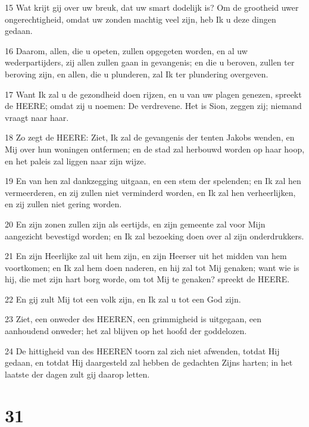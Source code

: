 \par 15 Wat krijt gij over uw breuk, dat uw smart dodelijk is? Om de grootheid uwer ongerechtigheid, omdat uw zonden machtig veel zijn, heb Ik u deze dingen gedaan.
\par 16 Daarom, allen, die u opeten, zullen opgegeten worden, en al uw wederpartijders, zij allen zullen gaan in gevangenis; en die u beroven, zullen ter beroving zijn, en allen, die u plunderen, zal Ik ter plundering overgeven.
\par 17 Want Ik zal u de gezondheid doen rijzen, en u van uw plagen genezen, spreekt de HEERE; omdat zij u noemen: De verdrevene. Het is Sion, zeggen zij; niemand vraagt naar haar.
\par 18 Zo zegt de HEERE: Ziet, Ik zal de gevangenis der tenten Jakobs wenden, en Mij over hun woningen ontfermen; en de stad zal herbouwd worden op haar hoop, en het paleis zal liggen naar zijn wijze.
\par 19 En van hen zal dankzegging uitgaan, en een stem der spelenden; en Ik zal hen vermeerderen, en zij zullen niet verminderd worden, en Ik zal hen verheerlijken, en zij zullen niet gering worden.
\par 20 En zijn zonen zullen zijn als eertijds, en zijn gemeente zal voor Mijn aangezicht bevestigd worden; en Ik zal bezoeking doen over al zijn onderdrukkers.
\par 21 En zijn Heerlijke zal uit hem zijn, en zijn Heerser uit het midden van hem voortkomen; en Ik zal hem doen naderen, en hij zal tot Mij genaken; want wie is hij, die met zijn hart borg worde, om tot Mij te genaken? spreekt de HEERE.
\par 22 En gij zult Mij tot een volk zijn, en Ik zal u tot een God zijn.
\par 23 Ziet, een onweder des HEEREN, een grimmigheid is uitgegaan, een aanhoudend onweder; het zal blijven op het hoofd der goddelozen.
\par 24 De hittigheid van des HEEREN toorn zal zich niet afwenden, totdat Hij gedaan, en totdat Hij daargesteld zal hebben de gedachten Zijns harten; in het laatste der dagen zult gij daarop letten.

\chapter{31}

